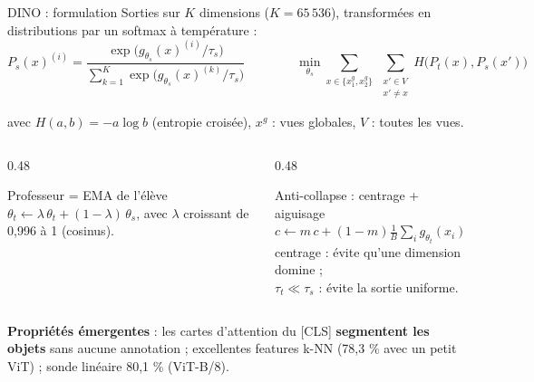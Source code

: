 \documentclass[aspectratio=169,10pt]{beamer}
\newcommand{\src}[1]{\par\vfill\hfill{\tiny\color{grisE}#1}}
\begin{document}
\begin{frame}{DINO : formulation}
  \small Sorties sur $K$ dimensions ($K = 65\,536$), transformées en distributions par un softmax à température :
  \[
    P_s(x)^{(i)} = \frac{\exp\big(g_{\theta_s}(x)^{(i)}/\tau_s\big)}{\sum_{k=1}^{K}\exp\big(g_{\theta_s}(x)^{(k)}/\tau_s\big)}
    \qquad\qquad
    \min_{\theta_s} \sum_{x\in\{x^g_1,x^g_2\}}\ \sum_{\substack{x'\in V\\ x'\neq x}} H\big(P_t(x), P_s(x')\big)
  \]
  \centerline{\footnotesize avec $H(a,b) = -a\log b$ (entropie croisée), $x^g$ : vues globales, $V$ : toutes les vues.}
  \vspace{1mm}
  \begin{columns}[T]
    \begin{column}{0.48\textwidth}
      \begin{block}{Professeur = EMA de l'élève}
        \small $\theta_t \leftarrow \lambda\,\theta_t + (1-\lambda)\,\theta_s$, avec $\lambda$ croissant de 0,996 à 1 (cosinus).
      \end{block}
    \end{column}
    \begin{column}{0.48\textwidth}
      \begin{block}{Anti-collapse : centrage + aiguisage}
        \small $c \leftarrow m\,c + (1-m)\frac{1}{B}\sum_i g_{\theta_t}(x_i)$\\
        centrage : évite qu'une dimension domine ;\\
        $\tau_t \ll \tau_s$ : évite la sortie uniforme.
      \end{block}
    \end{column}
  \end{columns}
  \vspace{1mm}
  \footnotesize\textbf{Propriétés émergentes} : les cartes d'attention du [CLS] \textbf{segmentent les objets} sans aucune annotation ; excellentes features k-NN (78,3 \% avec un petit ViT) ; sonde linéaire 80,1 \% (ViT-B/8).
  \src{\citet{caron2021dino}}
\end{frame}
\end{document}
